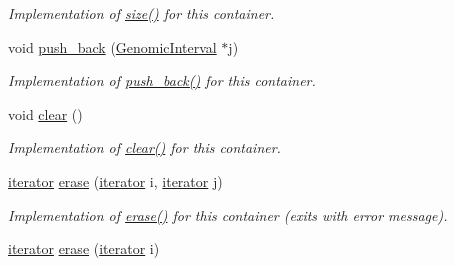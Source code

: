 \begin{DoxyCompactItemize}
\begin{DoxyCompactList}\small\item\em Implementation of \hyperlink{classGenomicIntervalSetAsArray_ad4bfef55744241849841c71d08835403}{size()} for this container. \end{DoxyCompactList}\item 
\hypertarget{classGenomicIntervalSetAsArray_a4348e7636cb91405b08374a966e33a7c}{
void \hyperlink{classGenomicIntervalSetAsArray_a4348e7636cb91405b08374a966e33a7c}{push\_\-back} (\hyperlink{classGenomicInterval}{GenomicInterval} $\ast$j)}
\label{classGenomicIntervalSetAsArray_a4348e7636cb91405b08374a966e33a7c}

\begin{DoxyCompactList}\small\item\em Implementation of \hyperlink{classGenomicIntervalSetAsArray_a4348e7636cb91405b08374a966e33a7c}{push\_\-back()} for this container. \end{DoxyCompactList}\item 
\hypertarget{classGenomicIntervalSetAsArray_a833395eaf9daa5626879eefa861d9ea5}{
void \hyperlink{classGenomicIntervalSetAsArray_a833395eaf9daa5626879eefa861d9ea5}{clear} ()}
\label{classGenomicIntervalSetAsArray_a833395eaf9daa5626879eefa861d9ea5}

\begin{DoxyCompactList}\small\item\em Implementation of \hyperlink{classGenomicIntervalSetAsArray_a833395eaf9daa5626879eefa861d9ea5}{clear()} for this container. \end{DoxyCompactList}\item 
\hypertarget{classGenomicIntervalSetAsArray_a0f8554cfca150d695d15691aa42df7fa}{
\hyperlink{classGenomicInterval}{iterator} \hyperlink{classGenomicIntervalSetAsArray_a0f8554cfca150d695d15691aa42df7fa}{erase} (\hyperlink{classGenomicInterval}{iterator} i, \hyperlink{classGenomicInterval}{iterator} j)}
\label{classGenomicIntervalSetAsArray_a0f8554cfca150d695d15691aa42df7fa}

\begin{DoxyCompactList}\small\item\em Implementation of \hyperlink{classGenomicIntervalSetAsArray_a0f8554cfca150d695d15691aa42df7fa}{erase()} for this container (exits with error message). \end{DoxyCompactList}\item 
\hypertarget{classGenomicIntervalSetAsArray_a0aae25ac2e9a7cf50a370703aa99df85}{
\hyperlink{classGenomicInterval}{iterator} \hyperlink{classGenomicIntervalSetAsArray_a0aae25ac2e9a7cf50a370703aa99df85}{erase} (\hyperlink{classGenomicInterval}{iterator} i)}
\label{classGenomicIntervalSetAsArray_a0aae25ac2e9a7cf50a370703aa99df85}


\end{DoxyCompactItemize}

